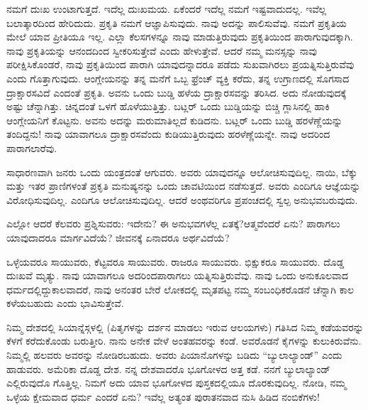 \vskip 5pt

ನಮಗೆ ದುಃಖ ಉಂಟಾಗುತ್ತದೆ. ಇದೆಲ್ಲ ದುಃಖಮಯ. ಏಕೆಂದರೆ ಇದೆಲ್ಲ ನಮಗೆ ಇಷ್ಟವಾದುದಲ್ಲ. ಇವೆಲ್ಲ ಬಲಾತ್ಕಾರದಿಂದ ಹೇರಿದುದು. ಪ್ರಕೃತಿ ನಮಗೆ ಆಜ್ಞಾಪಿಸುವುದು. ನಾವು ಅದನ್ನು ಪಾಲಿಸುವೆವು. ನಮಗೆ ಪ್ರಕೃತಿಯ ಮೇಲೆ ಯಾವ ಪ್ರೀತಿಯೂ ಇಲ್ಲ. ಎಲ್ಲಾ ಕೆಲಸಗಳನ್ನೂ ನಾವು ಮಾಡುತ್ತಿರುವುದು ಪ್ರಕೃತಿಯಿಂದ ಪಾರಾಗುವುದಕ್ಕಾಗಿ. ನಾವು ಪ್ರಕೃತಿಯನ್ನು ಆನಂದದಿಂದ ಸ್ವೀಕರಿಸುತ್ತೇವೆ ಎಂದು ಹೇಳುತ್ತೇವೆ. ಆದರೆ ನಮ್ಮ ಮನಸ್ಸನ್ನು ನಾವು ಪರೀಕ್ಷಿಸಿಕೊಂಡರೆ, ನಾವು ಪ್ರಕೃತಿಯಿಂದ ಪಾರಾಗಿ ಯಾವುದನ್ನಾದರೂ ಪಡೆದು ಸುಖವಾಗಿರಲು ಪ್ರಯತ್ನಿಸುತ್ತಿರುವೆವು ಎಂದು ಗೊತ್ತಾಗುವುದು. ಆಂಗ್ಲೇಯನನ್ನು ತನ್ನ ಮನೆಗೆ ಒಬ್ಬ ಫ್ರೆಂಚ್​ ವ್ಯಕ್ತಿ ಕರೆದು, ತನ್ನ ಉಗ್ರಾಣದಲ್ಲಿ ಸೊಗಸಾದ ದ್ರಾಕ್ಷಾರಸವಿದೆ ಎಂದಂತೆ ಪ್ರಕೃತಿ. ಅವನು ಒಂದು ಬುಡ್ಡಿ ಹಳೆಯ ದ್ರಾಕ್ಷಾರಸವನ್ನು ತರಿಸಿದ. ಅದು ನೋಡುವುದಕ್ಕೆ ಅಷ್ಟು ಚೆನ್ನಾಗಿತ್ತು. ಚಿನ್ನದಂತೆ ಒಳಗೆ ಹೊಳೆಯುತ್ತಿತ್ತು. ಬಟ್ಲರ್​ ಒಂದು ಬುಡ್ಡಿಯನ್ನು ಬಿಚ್ಚಿ ಗ್ಲಾಸಿನಲ್ಲಿ ಹಾಕಿ ಆಂಗ್ಲೇಯನಿಗೆ ಕೊಟ್ಟನು. ಅವನು ಅದನ್ನು ಮರುಮಾತಿಲ್ಲದೆ ಕುಡಿದನು. ಬಟ್ಲರ್​ ಒಂದು ಬುಡ್ಡಿ ಹರಳೆಣ್ಣೆಯನ್ನು ತಂದಿದ್ದನು! ನಾವು ಯಾವಾಗಲೂ ದ್ರಾಕ್ಷಾರಸವೆಂದು ಕುಡಿಯುತ್ತಿರುವುದು ಹರಳೆಣ್ಣೆಯನ್ನೇ. ನಾವು ಅದರಿಂದ ಪಾರಾಗಲಾರೆವು.

\vskip 5pt

ಸಾಧಾರಣವಾಗಿ ಜನರು ಒಂದು ಯಂತ್ರದಂತೆ ಆಗುವರು. ಅವರು ಯಾವುದನ್ನೂ ಆಲೋಚಿಸುವುದಿಲ್ಲ. ನಾಯಿ, ಬೆಕ್ಕು ಮತ್ತು ಇತರ ಪ್ರಾಣಿಗಳಂತೆ ಪ್ರಕೃತಿ ಮನುಷ್ಯನನ್ನು ಒಂದು ಚಾವಟಿಯಿಂದ ನಡೆಸುತ್ತದೆ. ಅವರು ಎಂದಿಗೂ ಆಜ್ಞೆಯನ್ನು ವಿರೋಧಿಸುವುದಿಲ್ಲ. ಎಂದಿಗೂ ಆಲೋಚಿಸುವುದಿಲ್ಲ. ಆದರೆ ಅಂಥವರಿಗೂ ಪ್ರಪಂಚದಲ್ಲಿ ಸ್ವಲ್ಪ ಅನುಭವ\break ಬರುವುದು.

\vskip 5pt

ಎಲ್ಲೋ ಆದರೆ ಕೆಲವರು ಪ್ರಶ್ನಿಸುವರು: ಇದೇನು? ಈ ಅನುಭವಗಳೆಲ್ಲ ಏತಕ್ಕೆ?\break ಆತ್ಮವೆಂದರೆ ಏನು? ಪಾರಾಗಲು ಯಾವುದಾದರೂ ಮಾರ್ಗವಿದೆಯೆ? ಜೀವನಕ್ಕೆ ಏನಾದರೂ ಅರ್ಥವಿದೆಯೆ?

\vskip 5pt

ಒಳ್ಳೆಯವರೂ ಸಾಯುವರು, ಕೆಟ್ಟವರೂ ಸಾಯುವರು. ರಾಜರೂ ಸಾಯುವರು. ಭಿಕ್ಷುಕರೂ ಸಾಯುವರು. ದೊಡ್ಡ ದುಃಖವೆ ಮೃತ್ಯು. ನಾವು ಯಾವಾಗಲೂ ಅದರಿಂದ\break ಪಾರಾಗಲು ಯತ್ನಿಸುತ್ತಿರುವೆವು. ನಾವು ಒಂದು ಅನುಕೂಲವಾದ ಧರ್ಮದಲ್ಲಿದ್ದು\break ಕಾಲವಾದರೆ, ನಾವು ಅನಂತರ ಬೇರೆ ಲೋಕದಲ್ಲಿ ಮೃತಪಟ್ಟ ನಮ್ಮ ಸಂಬಂಧಿಕರೊಡನೆ ಚೆನ್ನಾಗಿ ಕಾಲ ಕಳೆಯಬಹುದು ಎಂದು ಭಾವಿಸುತ್ತೇವೆ.

\vskip 5pt

ನಿಮ್ಮ ದೇಶದಲ್ಲಿ ಸಿಯಾನ್ನೆಸ್ಗಳಲ್ಲಿ (ಪಿತೃಗಳನ್ನು ದರ್ಶನ ಮಾಡಲು ಇರುವ ಆಲಯಗಳು) ಗತಿಸಿದ ನಿಮ್ಮ ಕಡೆಯವರನ್ನು ಕೆಳಗೆ ಕರೆದುಕೊಂಡು ಬರುತ್ತೀರಿ. ನಾನು ಅನೇಕ ವೇಳೆ ಅಂತಹವರನ್ನು ಕಂಡೆ. ಅವರೊಡನೆ ಕೈಗಳನ್ನು ಕುಲುಕಿರುವೆನು. ನಿಮ್ಮಲ್ಲಿ ಹಲವರು ಅವರನ್ನು ನೋಡಿರಬಹುದು. ಅವರು ಪಿಯಾನೊಗಳನ್ನು ಬಡಿದು “ಬ್ಯುಲಾಲ್ಯಾಂಡ್​” ಎಂದು ಹಾಡುವರು. ಅಮೆರಿಕಾ ದೊಡ್ಡ ದೇಶ. ನನ್ನ ದೇಶವಾದರೊ ಭೂಗೋಳದ ಅತ್ತ ಕಡೆ. ನನಗೆ ಬ್ಯುಲಾಲ್ಯಾಂಡ್​ ಎಲ್ಲಿರುವುದೊ ಗೊತ್ತಿಲ್ಲ. ನಿಮಗೆ ಅದು ಯಾವ ಭೂಗೋಳದ ಪುಸ್ತಕದಲ್ಲಿಯೂ ದೊರಕುವುದಿಲ್ಲ. ನೋಡಿ, ನಮ್ಮ ಒಳ್ಳೆಯ ಕ್ಷೇಮವಾದ ಧರ್ಮ ಎಂದರೆ ಏನು? ಇವೆಲ್ಲ ಅತ್ಯಂತ ಪುರಾತನವಾದ ನುಸಿ ಹಿಡಿದ ನಂಬಿಕೆಗಳು!

\vskip 6pt

